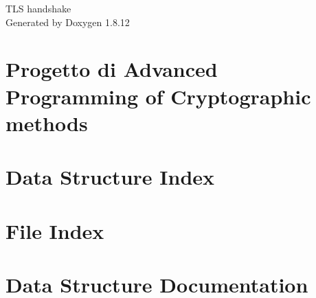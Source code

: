 \documentclass[twoside]{book}
\newcommand{\+}{\discretionary{\mbox{\scriptsize$\hookleftarrow$}}{}{}}
\newcommand{\clearemptydoublepage}{%
  \newpage{\pagestyle{empty}\cleardoublepage}%
}
\begin{document}
\begin{titlepage}
\vspace*{7cm}
\begin{center}%
{\Large T\+LS handshake }\\
\vspace*{1cm}
{\large Generated by Doxygen 1.8.12}\\
\end{center}
\end{titlepage}
\clearemptydoublepage
{}
\tableofcontents
\clearemptydoublepage
{}

\chapter{Progetto di Advanced Programming of Cryptographic methods}
\label{md___users__darka__dropbox__u_n_i_t_n__advanced_programming__project__r_e_a_d_m_e}

\chapter{Data Structure Index}

\chapter{File Index}

\chapter{Data Structure Documentation}














\end{document}
